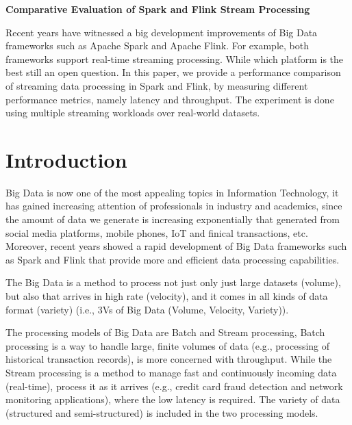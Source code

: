 \documentclass[]{article}
\begin{document}
\begin{flushleft}
\centering\LARGE {\bf Comparative Evaluation of Spark and Flink Stream Processing}
\thispagestyle{empty}
\end{flushleft}
\newpage
\tableofcontents

\newpage


\begin{abstract}

\end{abstract}
Recent years have witnessed a big development improvements of Big Data frameworks such as Apache Spark and Apache Flink. For example, both frameworks support real-time
streaming processing. While which platform is the best still an open question. 
In this paper, we provide a performance comparison of streaming data processing in Spark and Flink, by measuring different performance metrics, namely latency and throughput. The experiment is done using multiple streaming workloads over real-world datasets.
\section{Introduction}

\par Big Data is now one of the most appealing topics in Information Technology, it has gained increasing attention of professionals in industry and academics, since the amount of data we generate is increasing exponentially \cite{idc} that generated from social media platforms, mobile phones, IoT and finical transactions, etc. Moreover, recent years showed a rapid development of Big Data frameworks such as Spark and Flink that provide more and efficient data processing capabilities.
 \par The Big Data is a method to process not just only just large datasets (volume), but also that arrives in high rate (velocity), and it comes in all kinds of data format (variety) (i.e., 3Vs of Big Data (Volume, Velocity, Variety))\cite{svs}.

\par The processing models of Big Data are Batch and Stream processing, Batch processing is a way to handle large, finite volumes of data (e.g., processing of historical transaction records), is more concerned with throughput. While the Stream processing  is a method to manage fast and continuously incoming data (real-time), process it as it arrives (e.g., credit card fraud detection and network monitoring applications), where the low latency is required. The variety of data (structured and semi-structured) is included in the two processing models.
\end{document}
